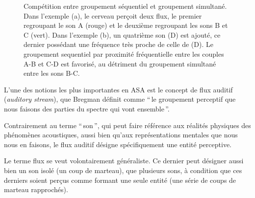 {\begin{figure}[t]
        \myfloatalign
        \caption[Compétition entre groupement séquentiel et groupement simultané]{Compétition entre groupement séquentiel et groupement simultané. Dans l'exemple (a), le cerveau perçoit deux flux, le premier regroupant le son A (rouge) et le deuxième regroupant les sons B et C (vert). Dans l'exemple (b), un quatrième son (D) est ajouté, ce dernier possédant une fréquence très proche de celle de (D). Le groupement sequentiel par proximité fréquentielle entre les couples A-B et C-D est favorisé, au détriment du groupement simultané entre les sons B-C.}\label{fig:simvsseq}
\end{figure}

L'une des notions les plus importantes en ASA est le concept de flux auditif (\emph{auditory stream}), que Bregman définit comme ``\,le groupement perceptif que nous faisons des parties du spectre qui vont ensemble\,''.

Contrairement au terme ``\,son\,'', qui peut faire référence aux réalités physiques des phénomènes acoustiques, aussi bien qu'aux représentations mentales que nous nous en faisons, le flux auditif désigne spécifiquement une entité perceptive.

Le terme flux se veut volontairement généraliste. Ce dernier peut désigner aussi bien un son isolé (un coup de marteau), que plusieurs sons, à condition que ces derniers soient perçus comme formant une seule entité (une série de coups de marteau rapprochés).

}
